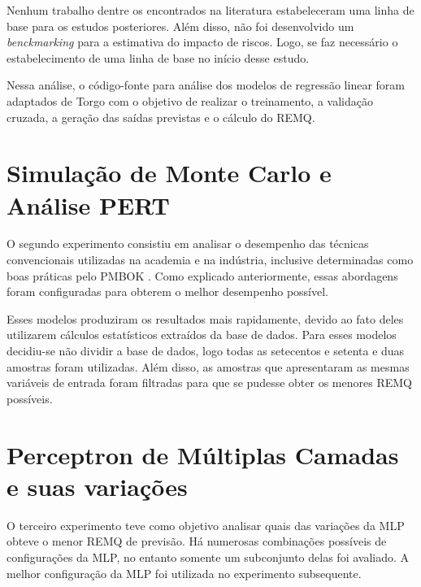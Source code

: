 Nenhum trabalho dentre os encontrados na literatura estabeleceram uma linha de base para os estudos posteriores. Além disso, não foi desenvolvido um \textit{benckmarking} para a estimativa do impacto de riscos. Logo, se faz necessário o estabelecimento de uma linha de base no início desse estudo.

Nessa análise, o código-fonte para análise dos modelos de regressão linear foram adaptados de Torgo \cite{torgo2003data} com o objetivo de realizar o treinamento, a validação cruzada, a geração das saídas previstas e o cálculo do REMQ.

\section{Simulação de Monte Carlo e Análise PERT}

O segundo experimento consistiu em analisar o desempenho das técnicas convencionais utilizadas na academia e na indústria, inclusive determinadas como boas práticas pelo PMBOK \cite{PMBOK2008}. Como explicado anteriormente, essas abordagens foram configuradas para obterem o melhor desempenho possível.

Esses modelos produziram os resultados mais rapidamente, devido ao fato deles utilizarem cálculos estatísticos extraídos da base de dados. Para esses modelos decidiu-se não dividir a base de dados, logo todas as setecentos e setenta e duas amostras foram utilizadas. Além disso, as amostras que apresentaram as mesmas variáveis de entrada foram filtradas para que se pudesse obter os menores REMQ possíveis.

\section{Perceptron de Múltiplas Camadas e suas variações}

O terceiro experimento teve como objetivo analisar quais das variações da MLP obteve o menor REMQ de previsão. Há numerosas combinações possíveis de configurações da MLP, no entanto somente um subconjunto delas foi avaliado. A melhor configuração da MLP foi utilizada no experimento subsequente.

